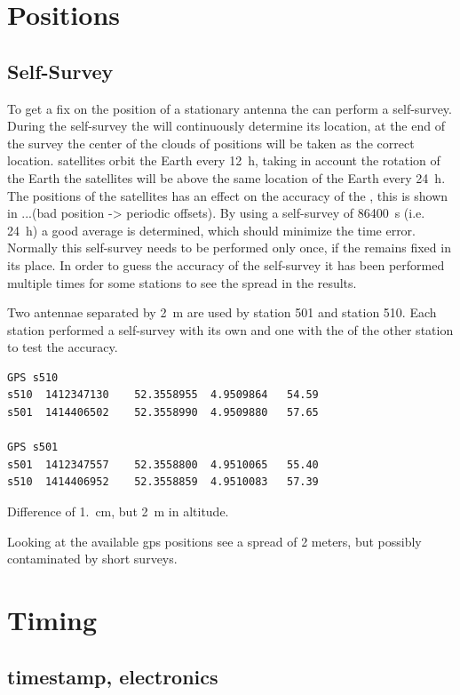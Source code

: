 \section{Positions}

\subsection{\gps Self-Survey}

To get a fix on the position of a stationary \gps antenna the \gps can perform a self-survey. During the self-survey the \gps will continuously determine its location, at the end of the survey the center of the clouds of positions will be taken as the correct location. \gps satellites orbit the Earth every \SI{12}{\hour}, taking in account the rotation of the Earth the \gps satellites will be above the same location of the Earth every \SI{24}{\hour}. The positions of the \gps satellites has an effect on the accuracy of the \gps, this is shown in ...(bad position -> periodic offsets). By using a self-survey of \SI{86400}{\second} (i.e. \SI{24}{\hour}) a good average is determined, which should minimize the time error. Normally this self-survey needs to be performed only once, if the \gps remains fixed in its place. In order to guess the accuracy of the self-survey it has been performed multiple times for some stations to see the spread in the results.

Two \gps antennae separated by \SI{2}{\meter} are used by station 501
and station 510. Each station performed a self-survey with its own \gps
and one with the \gps of the other station to test the accuracy.

\begin{verbatim}
GPS s510
s510  1412347130	52.3558955	4.9509864	54.59
s501  1414406502	52.3558990	4.9509880	57.65

GPS s501
s501  1412347557	52.3558800	4.9510065	55.40
s510  1414406952	52.3558859	4.9510083	57.39
\end{verbatim}

Difference of \SI{1.}{\centi\meter}, but \SI{2}{\meter} in altitude.

Looking at the available gps positions see a spread of 2 meters, but possibly contaminated by short surveys.


\section{Timing}

\subsection{\gps timestamp, electronics}

